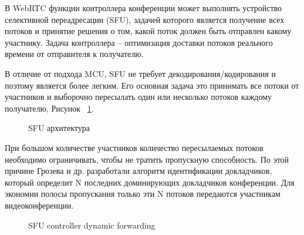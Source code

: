 В WebRTC функции контроллера конференции может выполнять устройство селективной переадресации (SFU), задачей которого является получение всех потоков и принятие решения о том, какой поток должен быть отправлен какому участнику. Задача контроллера -- оптимизация доставки потоков реального времени от отправителя к получателю.

В отличие от подхода MCU, SFU не требует декодирования/кодирования и поэтому является более легким. Его основная задача это принимать все потоки от участников и выборочно пересылать один или несколько потоков каждому получателю, Рисунок ~\ref{sfu}.

\begin{figure}[ht]
\begin{center}

\caption{
\label{sfu}
     SFU архитектура}
\end {center}
\end {figure}

При большом количестве участников количество пересылаемых потоков необходимо ограничивать, чтобы не тратить пропускную способность. По этой причине Грозева и др. разработали алгоритм идентификации докладчиков, который определит N последних доминирующих докладчиков конференции. Для экономии полосы пропускания только эти N потоков передаются участникам видеоконференции.

\begin{figure}[ht]
\begin{center}

\caption{
\label{sfu-forwarding}
     SFU controller dynamic forwarding}
\end {center}
\end {figure}

